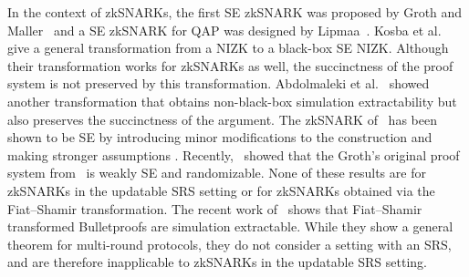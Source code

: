 In the context of zkSNARKs, the first
SE zkSNARK was proposed by Groth and Maller~\cite{C:GroMal17} and a SE
zkSNARK for QAP was designed by Lipmaa~\cite{EPRINT:Lipmaa19a}.
Kosba et
al.~\cite{EPRINT:KZMQCP15} give a general transformation from a NIZK to a
black-box SE NIZK. Although their transformation works for zkSNARKs as well,
the succinctness of the proof system is not preserved by this transformation.
Abdolmaleki et al.~\cite{CCS:AbdRamSla20} showed another transformation that
obtains non-black-box simulation extractability but also preserves
the succinctness of the argument. 
The zkSNARK of~\cite{EC:Groth16} has been shown to be SE by introducing minor modifications to the construction and making
stronger assumptions \cite{EPRINT:BowGab18,EPRINT:AtaBag19}. Recently,~\cite{EPRINT:BKSV20} showed that the
 Groth's original proof system from~\cite{EC:Groth16} is weakly SE and
randomizable. None of these results are for zkSNARKs in the updatable SRS setting or for zkSNARKs obtained via the Fiat--Shamir transformation. The recent work of~\cite{cryptoeprint:GOPTT22} shows that Fiat--Shamir transformed Bulletproofs are simulation extractable. While they show a general theorem for multi-round protocols, they do not consider a setting with an SRS, and are therefore inapplicable to zkSNARKs in the updatable SRS setting.



